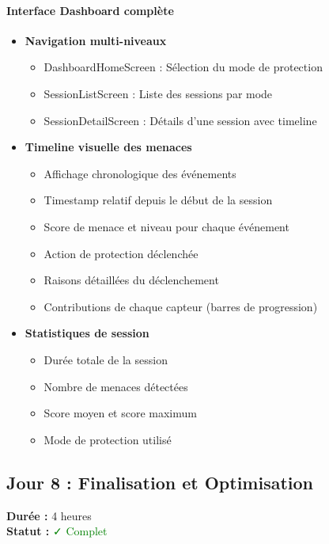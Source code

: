\documentclass[11pt,a4paper]{article}
\begin{document}
\paragraph{Interface Dashboard complète}
\begin{itemize}
    \item \textbf{Navigation multi-niveaux}
    \begin{itemize}
        \item DashboardHomeScreen : Sélection du mode de protection
        \item SessionListScreen : Liste des sessions par mode
        \item SessionDetailScreen : Détails d'une session avec timeline
    \end{itemize}
    \item \textbf{Timeline visuelle des menaces}
    \begin{itemize}
        \item Affichage chronologique des événements
        \item Timestamp relatif depuis le début de la session
        \item Score de menace et niveau pour chaque événement
        \item Action de protection déclenchée
        \item Raisons détaillées du déclenchement
        \item Contributions de chaque capteur (barres de progression)
    \end{itemize}
    \item \textbf{Statistiques de session}
    \begin{itemize}
        \item Durée totale de la session
        \item Nombre de menaces détectées
        \item Score moyen et score maximum
        \item Mode de protection utilisé
    \end{itemize}
\end{itemize}

\subsection{Jour 8 : Finalisation et Optimisation}

\textbf{Durée :} 4 heures \\
\textbf{Statut :} \textcolor{green}{✓ Complet}
\end{document}
